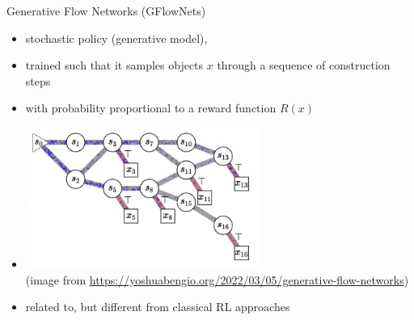 \documentclass[aspectratio=1610]{beamer}
\newcommand{\important}[1]{{\color{green!60!black}#1}}
\renewcommand{\footnotesize}{\scriptsize}
\begin{document}
	
	



\begin{frame}{Generative Flow Networks (GFlowNets)}

	\citet{bengio-21a}
	
	\begin{itemize}
		\item \important{stochastic policy} (generative model),
		\item trained such that it samples objects $x$ through a sequence of construction steps
		\item with probability \important{proportional to a reward function $R(x)$}
		\item 

	\includegraphics[width=0.6\textwidth]{graphics/gflownet_anim.png}\\
	{\footnotesize (image from \url{https://yoshuabengio.org/2022/03/05/generative-flow-networks})}

	\item related to, but different from classical RL approaches
	\end{itemize}
\end{frame}
\end{document}
